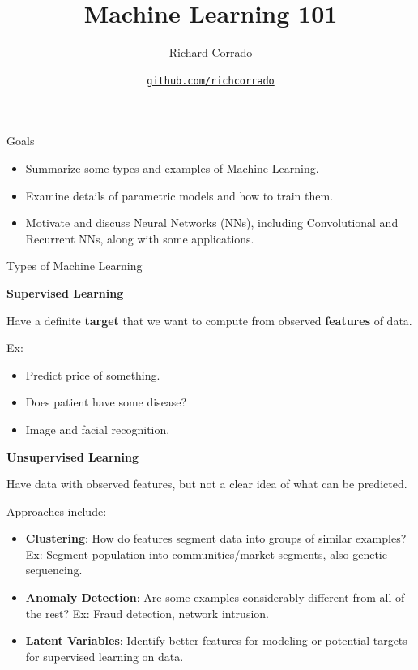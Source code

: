 \documentclass[12pt,t]{beamer}
\title{Machine Learning 101}
\author{\href{http://richcorrado.github.io}{Richard Corrado}}
\institute{Fat Cat Machine Learning}
\date{\href{https://github.com/richcorrado}{\tt \scriptsize github.com/richcorrado}}
\begin{document}
{
	\frame{
		\titlepage
} } 
	


\begin{frame}{Goals}

\begin{itemize}
\item Summarize some types and examples of Machine Learning.
\item Examine details of parametric models and how to train them.
\item Motivate and discuss Neural Networks (NNs), including Convolutional and Recurrent NNs, along with some applications.
\end{itemize}


\end{frame}

\begin{frame}{Types of Machine Learning}

{\bf Supervised Learning} 
\bigskip

 Have a definite {\bf target} that we want to compute from observed {\bf features} of data.  
\bigskip

Ex:
\begin{itemize}
\item   Predict price of something.
\item  Does patient have some disease?
\item Image and facial recognition.
\end{itemize}


\end{frame}

\begin{frame}

{\bf Unsupervised Learning}
\bigskip

 Have data with  observed features,  but not a clear idea of what can be predicted. 
\bigskip

Approaches include:

\begin{itemize}
\item {\bf Clustering}: How do features segment data into groups of similar examples? Ex: Segment population into communities/market segments,  also genetic sequencing.
\item {\bf Anomaly Detection}: Are some examples considerably different from all of the rest? Ex: Fraud detection, network intrusion.  
\item {\bf Latent Variables}: Identify better features for modeling or potential targets for supervised learning on data.

\end{itemize}
\end{frame}
\end{document}
